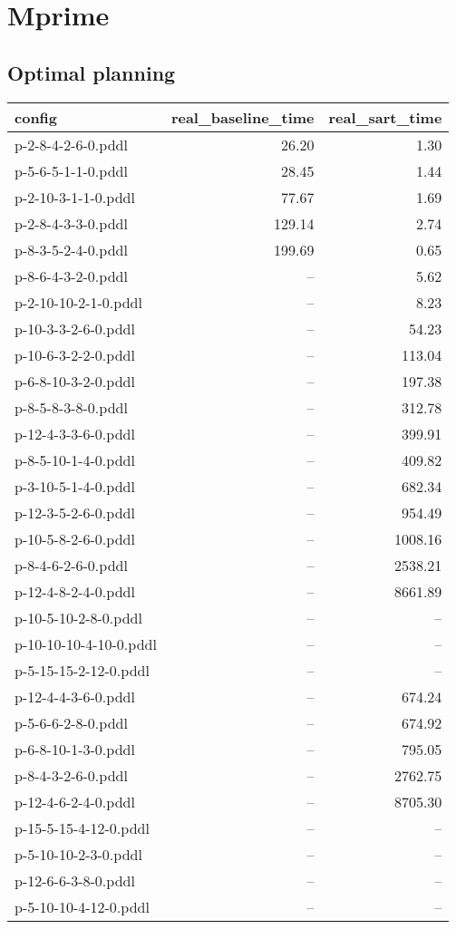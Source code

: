 \documentclass{article}
\begin{document}
                \newpage \section{Mprime}
                    \subsection*{Optimal planning}
                    
                            \begin{center}
                            \scriptsize
                            \begin{tabular}{@{}l|r|r@{}}
                            config & real\_baseline\_time & real\_sart\_time\\\midrule
                             p-2-8-4-2-6-0.pddl&26.20&1.30\\
 p-5-6-5-1-1-0.pddl&28.45&1.44\\
 p-2-10-3-1-1-0.pddl&77.67&1.69\\
 p-2-8-4-3-3-0.pddl&129.14&2.74\\
 p-8-3-5-2-4-0.pddl&199.69&0.65\\
 p-8-6-4-3-2-0.pddl&--&5.62\\
 p-2-10-10-2-1-0.pddl&--&8.23\\
 p-10-3-3-2-6-0.pddl&--&54.23\\
 p-10-6-3-2-2-0.pddl&--&113.04\\
 p-6-8-10-3-2-0.pddl&--&197.38\\
 p-8-5-8-3-8-0.pddl&--&312.78\\
 p-12-4-3-3-6-0.pddl&--&399.91\\
 p-8-5-10-1-4-0.pddl&--&409.82\\
 p-3-10-5-1-4-0.pddl&--&682.34\\
 p-12-3-5-2-6-0.pddl&--&954.49\\
 p-10-5-8-2-6-0.pddl&--&1008.16\\
 p-8-4-6-2-6-0.pddl&--&2538.21\\
 p-12-4-8-2-4-0.pddl&--&8661.89\\
 p-10-5-10-2-8-0.pddl&--&--\\
 p-10-10-10-4-10-0.pddl&--&--\\
 p-5-15-15-2-12-0.pddl&--&--\\
 p-12-4-4-3-6-0.pddl&--&674.24\\
 p-5-6-6-2-8-0.pddl&--&674.92\\
 p-6-8-10-1-3-0.pddl&--&795.05\\
 p-8-4-3-2-6-0.pddl&--&2762.75\\
 p-12-4-6-2-4-0.pddl&--&8705.30\\
 p-15-5-15-4-12-0.pddl&--&--\\
 p-5-10-10-2-3-0.pddl&--&--\\
 p-12-6-6-3-8-0.pddl&--&--\\
 p-5-10-10-4-12-0.pddl&--&--
                            \end{tabular}
                            \end{center}
                    
\end{document}
